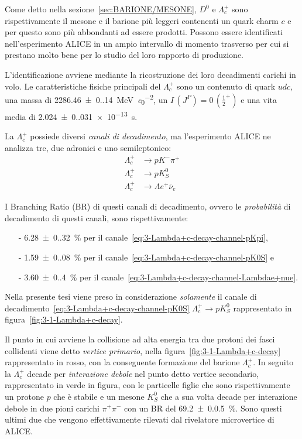 Come detto nella sezione~\ref{sec:BARIONE/MESONE}, $D^{0}$ e $\Lambda_{c}^{+}$ sono rispettivamente il mesone e il barione più leggeri contenenti un quark charm $c$ e per questo sono più abbondanti ad essere prodotti. Possono essere identificati nell'esperimento ALICE in un ampio intervallo di momento trasverso per cui si prestano molto bene per lo studio del loro rapporto di produzione.

L'identificazione avviene mediante la ricostruzione dei loro decadimenti carichi in volo. Le caratteristiche fisiche principali del $\Lambda_{c}^{+}$ sono un contenuto di quark $udc$, una massa di \qty{2286.46(0.14)}{\mega \eV \per \clight^2}, un $I\,(J^P) = 0\,({\frac{1}{2}}^{+})$ e una vita media di \qty{2.024(0.031)e-13}{\second}.

La $\Lambda_{c}^{+}$ possiede diversi \textit{canali di decadimento}, ma l'esperimento ALICE ne analizza tre, due adronici e uno semileptonico:
\begin{align}
    \Lambda_{c}^{+} & \to p K^{-} \pi^{+} 
    \label{eq:3-Lambda+c-decay-channel-pKpi} \\
    \Lambda_{c}^{+} & \to p K^{0}_{S}
    \label{eq:3-Lambda+c-decay-channel-pK0S} \\
    \Lambda_{c}^{+} & \to \Lambda e^{+} \bar{\nu}_{e}
    \label{eq:3-Lambda+c-decay-channel-Lambdae+nue}
\end{align}

I Branching Ratio (BR) di questi canali di decadimento, ovvero le \textit{probabilità} di decadimento di questi canali, sono rispettivamente:
\begin{itemize}
    \item[-] \qty{6.28(0.32)}{\percent} per il canale~\ref{eq:3-Lambda+c-decay-channel-pKpi},

    \item[-] \qty{1.59(0.08)}{\percent} per il canale~\ref{eq:3-Lambda+c-decay-channel-pK0S} e

    \item[-] \qty{3.60(0.40)}{\percent} per il canale~\ref{eq:3-Lambda+c-decay-channel-Lambdae+nue}.
\end{itemize}
Nella presente tesi viene preso in considerazione \textit{solamente} il canale di decadimento~\ref{eq:3-Lambda+c-decay-channel-pK0S} $\Lambda_{c}^{+} \to p K^{0}_{S}$ rappresentato in
figura~\ref{fig:3-1-Lambda+c-decay}.

Il punto in cui avviene la collisione ad alta energia tra due protoni dei fasci collidenti viene detto \textit{vertice primario}, nella figura~\ref{fig:3-1-Lambda+c-decay} rappresentato in rosso, con la conseguente formazione del barione $\Lambda_{c}^{+}$. In seguito la $\Lambda_{c}^{+}$ decade per \textit{interazione debole} nel punto detto vertice secondario, rappresentato in verde in figura, con le particelle figlie che sono rispettivamente un protone $p$ che è stabile e un mesone $K^{0}_{S}$ che a sua volta decade per interazione debole in due pioni carichi $\pi^{+} \pi^{-}$ con un BR del \qty{69.2(0.05)}{\percent}. Sono questi ultimi due che vengono effettivamente rilevati dal rivelatore microvertice di ALICE.

